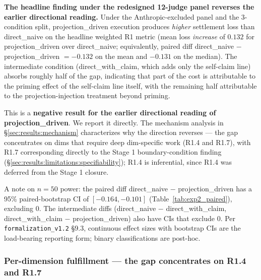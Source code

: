 \textbf{The headline finding under the redesigned 12-judge panel reverses the earlier directional reading.} Under the Anthropic-excluded panel and the 3-condition split, projection\_driven execution produces \emph{higher} settlement loss than direct\_naive on the headline weighted R1 metric (mean loss \emph{increase} of $0.132$ for projection\_driven over direct\_naive; equivalently, paired diff direct\_naive $-$ projection\_driven $= -0.132$ on the mean and $-0.131$ on the median). The intermediate condition (direct\_with\_claim, which adds only the self-claim line) absorbs roughly half of the gap, indicating that part of the cost is attributable to the priming effect of the self-claim line itself, with the remaining half attributable to the projection-injection treatment beyond priming.

This is a \textbf{negative result for the earlier directional reading of projection\_driven}. We report it directly. The mechanism analysis in \S\ref{sec:results:mechanism} characterizes why the direction reverses --- the gap concentrates on dims that require deep dim-specific work (R1.4 and R1.7), with R1.7 corresponding directly to the Stage 1 boundary-condition finding (\S\ref{sec:results:limitations:specifiability}); R1.4 is inferential, since R1.4 was deferred from the Stage 1 closure.

A note on $n = 50$ power: the paired diff direct\_naive $-$ projection\_driven has a 95\% paired-bootstrap CI of $[-0.164, -0.101]$ (Table~\ref{tab:exp2_paired}), excluding $0$. The intermediate diffs (direct\_naive $-$ direct\_with\_claim, direct\_with\_claim $-$ projection\_driven) also have CIs that exclude $0$. Per \texttt{formalization\_v1.2} \S9.3, continuous effect sizes with bootstrap CIs are the load-bearing reporting form; binary classifications are post-hoc.

\subsubsection{Per-dimension fulfillment --- the gap concentrates on R1.4 and R1.7}
\label{sec:results:exp2:by_dim}

